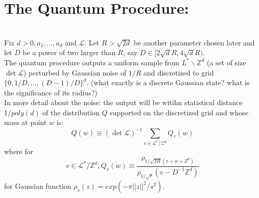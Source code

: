\documentclass{article}
\begin{document}
\section*{The Quantum Procedure:}\\
Fix $d > 0, a_1, \dots, a_d$ and $\mathcal{L}$. Let $R> \sqrt{2d}$ be another parameter chosen later and let $D$ be a power of two larger than $R$, say $D \in [ 2\sqrt{d} R, 4\sqrt{d} R)$.\\
The quantum procedure outputs a uniform sample from $L^* \backslash \mathbb{Z}^d$ (a set of size $\det \mathcal{L}$) perturbed by Gaussian noise of $1/R$ and discretized to grid $\{0,1/D, \dots, (D-1)/D \}^d$. (what exactly is a discrete Gaussian state? what is the significance of its radius?)\\ 
In more detail about the noise: the output will be witihn statistical distance $1/poly(d)$ of the distribution $Q$ supported on the discretized grid and whose mass at point $w$ is:
$$Q(w) \equiv (\det \mathcal{L})^{-1} \sum_{v \in \mathcal{L}^* / \mathcal{Z}^d} Q_v(w)$$
where for $$v \in \mathcal{L}^* / \mathbb{Z}^d, Q_v(w) \equiv \frac{\rho_{1/\sqrt{2R} (v+ w + Z^d)}}{\rho_{1/\sqrt{r}} (v- D^{-1} \mathbb{Z}^d)}$$
for Gaussian function $\rho_s(z) = exp(-\pi ||z||^2 / s^2)$.\\
\end{document}
